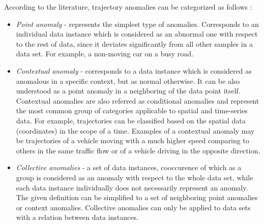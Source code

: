 According to the literature, trajectory anomalies can be categorized as follows \cite{article:15_survey_ad}\cite{article:6_survey_anom_det_rtuvs}:
\begin{itemize}
	\item \textit{Point anomaly} - represents the simplest type of anomalies. Corresponds to an individual data instance which is considered as an abnormal one with respect to the rest of data, since it deviates significantly from all other samples in a data set. For example, a non-moving car on a busy road.
	\item \textit{Contextual anomaly} - corresponds to a data instance which is considered as anomalous in a specific context, but as normal otherwise. It can be also understood as a point anomaly in a neighboring of the data point itself. Contextual anomalies are also referred as conditional anomalies and represent the most common group of categories applicable to spatial and time-series data. For example, trajectories can be classified based on the spatial data (coordinates) in the scope of a time. Examples of a contextual anomaly may be trajectories of a vehicle moving with a much higher speed comparing to others in the same traffic flow or of a vehicle driving in the opposite direction.
	\item \textit{Collective anomalies} - a set of data instances, cooccurence of which as a group is considered as an anomaly with respect to the whole data set, while each data instance individually does not necessarily represent an anomaly. The given definition can be simplified to a set of neighboring point anomalies or context anomalies. Collective anomalies can only be applied to data sets with a relation between data instances.
\end{itemize}
 
